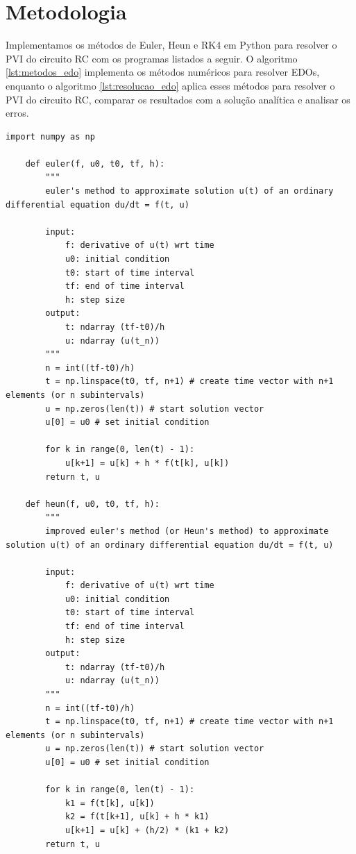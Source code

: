 \documentclass[11pt]{article}
\begin{document}
\section{Metodologia}

Implementamos os métodos de Euler, Heun e RK4 em Python para resolver o PVI do circuito RC com os programas listados a seguir. O algoritmo \cref{lst:metodos_edo} implementa os métodos numéricos para resolver EDOs, enquanto o algoritmo \cref{lst:resolucao_edo} aplica esses métodos para resolver o PVI do circuito RC, comparar os resultados com a solução analítica e analisar os erros.

\begin{lstlisting}[style=python-custom, caption={Algoritmos para os métodos de Euler, Heun e RK4.}, label={lst:metodos_edo}]
    import numpy as np

    def euler(f, u0, t0, tf, h):
        """
        euler's method to approximate solution u(t) of an ordinary differential equation du/dt = f(t, u)

        input:
            f: derivative of u(t) wrt time
            u0: initial condition
            t0: start of time interval
            tf: end of time interval
            h: step size
        output:
            t: ndarray (tf-t0)/h
            u: ndarray (u(t_n))
        """
        n = int((tf-t0)/h)
        t = np.linspace(t0, tf, n+1) # create time vector with n+1 elements (or n subintervals)
        u = np.zeros(len(t)) # start solution vector
        u[0] = u0 # set initial condition

        for k in range(0, len(t) - 1):
            u[k+1] = u[k] + h * f(t[k], u[k])
        return t, u

    def heun(f, u0, t0, tf, h):
        """
        improved euler's method (or Heun's method) to approximate solution u(t) of an ordinary differential equation du/dt = f(t, u)

        input:
            f: derivative of u(t) wrt time
            u0: initial condition
            t0: start of time interval
            tf: end of time interval
            h: step size
        output:
            t: ndarray (tf-t0)/h
            u: ndarray (u(t_n))
        """
        n = int((tf-t0)/h)
        t = np.linspace(t0, tf, n+1) # create time vector with n+1 elements (or n subintervals)
        u = np.zeros(len(t)) # start solution vector
        u[0] = u0 # set initial condition

        for k in range(0, len(t) - 1):
            k1 = f(t[k], u[k])
            k2 = f(t[k+1], u[k] + h * k1)
            u[k+1] = u[k] + (h/2) * (k1 + k2)
        return t, u


\end{lstlisting}
\end{document}
